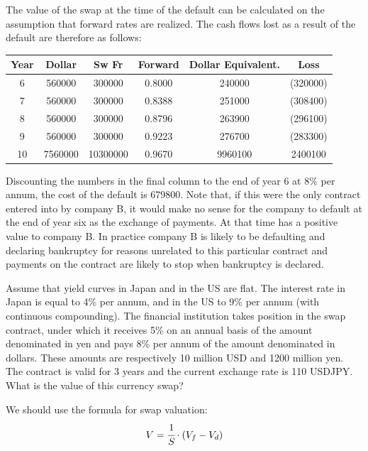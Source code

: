 \documentclass[12pt,a4paper]{exam}
\begin{document}
\begin{questions}
\begin{solution}
The value of the swap at the time of the default can be calculated on the assumption that forward rates are realized. The cash flows lost as a result of the default are therefore as follows:

\begin{center}
	\begin{tabular}{|c|c|c|c|c|c|}
\hline
Year & Dollar& Sw Fr & Forward &Dollar Equivalent. & Loss \\ \hline
6 &560000& 300000& 0.8000& 240000 & (320000) \\ \hline
7 &560000& 300000& 0.8388& 251000 & (308400) \\ \hline
8 &560000& 300000& 0.8796& 263900 & (296100) \\ \hline
9 &560000& 300000& 0.9223& 276700 & (283300) \\ \hline
10& 7560000& 10300000& 0.9670& 9960100 & 2400100 \\ \hline
	\end{tabular}
\end{center}

Discounting the numbers in the final column to the end of year 6 at 8\% per annum, the cost of the default is 679800. Note that, if this were the only contract entered into by company B, it would make no sense for the company to default at the end of year six as the exchange of payments. At that time has a positive value to company B.
In practice company B is likely to be defaulting and declaring bankruptcy for reasons unrelated to this particular contract and payments on the contract are likely to stop when bankruptcy is declared.
\end{solution}



\question Assume that yield curves in Japan and in the US are flat. The interest rate in Japan is equal to 4\% per annum, and in the US to 9\% per annum (with continuous compounding). The financial institution takes position in the swap contract, under which it receives 5\% on an annual basis of the amount denominated in yen and pays 8\% per annum of the amount denominated in dollars. These amounts are respectively 10 million USD and 1200 million yen. The contract is valid for 3 years and the current exchange rate is 110 USDJPY. What is the value of this currency swap?
\begin{solution}
We should use the formula for swap valuation: 
\begin{equation*}
V=\cfrac{1}{S}\cdot(V_f-V_d)
\end{equation*}


\end{solution}
\end{questions}
\end{document}
